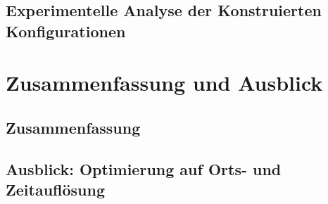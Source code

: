 	\section{Experimentelle Analyse der Konstruierten Konfigurationen}
	
\chapter{Zusammenfassung und Ausblick}
	\section{Zusammenfassung}
	
	\section{Ausblick: Optimierung auf Orts- und Zeitauflösung}		
